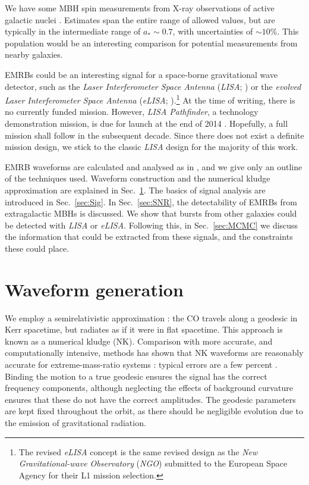 \documentclass[useAMS,usedcolumn,usegraphicx,usenatbib]{mn2e}
\newcommand{\secref}[1]{Sec.~\ref{sec:#1}}
\begin{document}
We have some MBH spin measurements from X-ray observations of active galactic nuclei \citep[e.g.][]{Nardini2011, Patrick2011, Gallo2011, Lohfink2012}. Estimates span the entire range of allowed values, but are typically in the intermediate range of $a_\ast \sim 0.7$, with uncertainties of $\sim 10\%$. This population would be an interesting comparison for potential measurements from nearby galaxies.

EMRBs could be an interesting signal for a space-borne gravitational wave detector, such as the \textit{Laser Interferometer Space Antenna} (\textit{LISA}; \citealt{Bender1998, Danzmann2003}) or the \textit{evolved Laser Interferometer Space Antenna} (\textit{eLISA}; \citealt{Jennrich2011, Amaro-Seoane2012a}).\footnote{The revised \textit{eLISA} concept is the same revised design as the \textit{New Gravitational-wave Observatory} (\textit{NGO}) submitted to the European Space Agency for their L1 mission selection.} At the time of writing, there is no currently funded mission. However, \textit{LISA Pathfinder}, a technology demonstration mission, is due for launch at the end of 2014 \citep{Anza2005, Antonucci2012}. Hopefully, a full mission shall follow in the subsequent decade. Since there does not exist a definite mission design, we stick to the classic \textit{LISA} design for the majority of this work.

EMRB waveforms are calculated and analysed as in \citet{Berry2013}, and we give only an outline of the techniques used. Waveform construction and the numerical kludge approximation are explained in \secref{Wave}. The basics of signal analysis are introduced in \secref{Sig}. In \secref{SNR}, the detectability of EMRBs from extragalactic MBHs is discussed. We show that bursts from other galaxies could be detected with \textit{LISA} or \textit{eLISA}. Following this, in \secref{MCMC} we discuss the information that could be extracted from these signals, and the constraints these could place.

\section{Waveform generation}\label{sec:Wave}

We employ a semirelativistic approximation \citep{Ruffini1981}: the CO travels along a geodesic in Kerr spacetime, but radiates as if it were in flat spacetime. This approach is known as a numerical kludge (NK). Comparison with more accurate, and computationally intensive, methods has shown that NK waveforms are reasonably accurate for extreme-mass-ratio systems \citep{Gair2005, Babak2007}: typical errors are a few percent \citep{Tanaka1993,Gair2005,Berry2013}. Binding the motion to a true geodesic ensures the signal has the correct frequency components, although neglecting the effects of background curvature ensures that these do not have the correct amplitudes. The geodesic parameters are kept fixed throughout the orbit, as there should be negligible evolution due to the emission of gravitational radiation.
\end{document}
